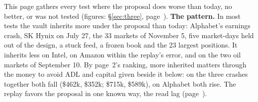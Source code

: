 {\small
This page gathers every test where the proposal does worse than today, no better, or was not tested (figures: \S\ref{sec:three}, page~\pageref{sec:three}). \textbf{The pattern.} In most tests the vault inherits more under the proposal than today: Alphabet's earnings crash, SK Hynix on July 27, the 33 markets of November 5, five market-days held out of the design, a stuck feed, a frozen book and the 23 largest positions. It inherits less on Intel, on Amazon within the replay's error, and on the two oil markets of September 10. By page~2's ranking, more inherited matters through the money to avoid ADL and capital given beside it below: on the three crashes together both fall (\$462k, \$352k; \$715k, \$589k), on Alphabet both rise. The replay favors the proposal in one known way, the read lag (page~\pageref{sec:limits}).

}
